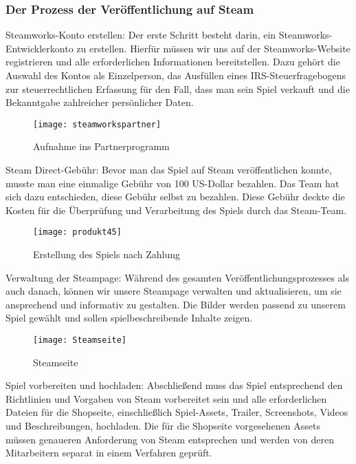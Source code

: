 \subsubsection{Der Prozess der Veröffentlichung auf Steam}\label{subsubsec:Veröffentlichungsprozess}

Steamworks-Konto erstellen:
Der erste Schritt besteht darin, ein Steamworks-Entwicklerkonto zu erstellen.
Hierfür müssen wir uns auf der Steamworks-Website registrieren und alle erforderlichen Informationen bereitstellen.
Dazu gehört die Auswahl des Kontos als Einzelperson, das Ausfüllen eines IRS-Steuerfragebogens zur steuerrechtlichen Erfassung für den Fall, dass man sein Spiel verkauft und die Bekanntgabe zahlreicher persönlicher Daten.

\begin{figure}[H]
    \centering
    \texttt{[image: steamworkspartner]}
    \caption{Aufnahme ins Partnerprogramm}
\end{figure}

Steam Direct-Gebühr:
Bevor man das Spiel auf Steam veröffentlichen konnte, musste man eine einmalige Gebühr von 100 US-Dollar bezahlen.
Das Team hat sich dazu entschieden, diese Gebühr selbst zu bezahlen.
Diese Gebühr deckte die Kosten für die Überprüfung und Verarbeitung des Spiels durch das Steam-Team.
\begin{figure}[H]
    \centering
    \texttt{[image: produkt45]}
    \caption{Erstellung des Spiels nach Zahlung}
\end{figure}

Verwaltung der Steampage: Während des gesamten Veröffentlichungsprozesses als auch danach, können wir unsere Steampage verwalten und aktualisieren, um sie ansprechend und informativ zu gestalten.
Die Bilder werden passend zu unserem Spiel gewählt und sollen spielbeschreibende Inhalte zeigen.
\begin{figure}[H]
    \centering
    \texttt{[image: Steamseite]}
    \caption{Steamseite}
\end{figure}

Spiel vorbereiten und hochladen:
Abschließend muss das Spiel entsprechend den Richtlinien und Vorgaben von Steam vorbereitet sein und alle erforderlichen Dateien für die Shopseite, einschließlich Spiel-Assets, Trailer, Screenshots, Videos und Beschreibungen, hochladen.
Die für die Shopseite vorgesehenen Assets müssen genaueren Anforderung von Steam entsprechen und werden von deren Mitarbeitern separat in einem Verfahren geprüft.

